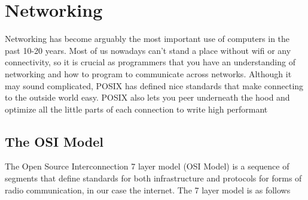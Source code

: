 \documentclass[]{article}
\date{}
\begin{document}
\section{Networking}\label{networking}

Networking has become arguably the most important use of computers in
the past 10-20 years. Most of us nowadays can't stand a place without
wifi or any connectivity, so it is crucial as programmers that you have
an understanding of networking and how to program to communicate across
networks. Although it may sound complicated, POSIX has defined nice
standards that make connecting to the outside world easy. POSIX also
lets you peer underneath the hood and optimize all the little parts of
each connection to write high performant

\subsection{The OSI Model}\label{the-osi-model}

The Open Source Interconnection 7 layer model (OSI Model) is a sequence
of segments that define standards for both infrastructure and protocols
for forms of radio communication, in our case the internet. The 7 layer
model is as follows
\end{document}
